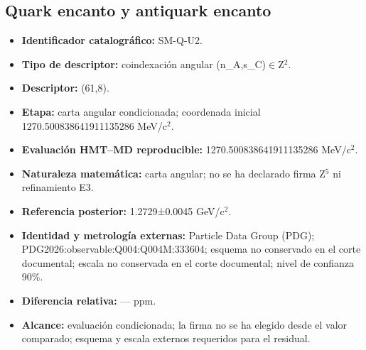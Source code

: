 \subsection{Quark encanto y antiquark encanto}
\begin{itemize}
\item \textbf{Identificador catalográfico:} SM-Q-U2.
\item \textbf{Tipo de descriptor:} coindexación angular (n\_A,s\_C)\(\in\)Z\({}^{2}\).
\item \textbf{Descriptor:} (61,8).
\item \textbf{Etapa:} carta angular condicionada; coordenada inicial 1270.500838\allowbreak{}641911\allowbreak{}135286 MeV/c\({}^{2}\).
\item \textbf{Evaluación HMT--MD reproducible:} 1270.500838\allowbreak{}641911\allowbreak{}135286 MeV/c\({}^{2}\).
\item \textbf{Naturaleza matemática:} carta angular; no se ha declarado firma Z\({}^{5}\) ni refinamiento E3.
\item \textbf{Referencia posterior:} 1.2729±\allowbreak{}0.0045 GeV/c\({}^{2}\).
\item \textbf{Identidad y metrología externas:} Particle Data Group (PDG); PDG2026:\allowbreak{}observable:\allowbreak{}Q004:\allowbreak{}Q004M:\allowbreak{}333604; esquema no conservado en el corte documental; escala no conservada en el corte documental; nivel de confianza 90\%.
\item \textbf{Diferencia relativa:} --- ppm.
\item \textbf{Alcance:} evaluación condicionada; la firma no se ha elegido desde el valor comparado; esquema y escala externos requeridos para el residual.
\end{itemize}
